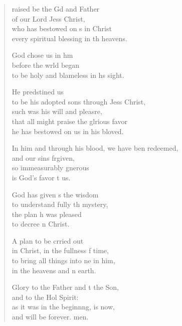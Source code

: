\settowidth{\versewidth}{In him and through his blood, we have been redeemed, *}
\begin{verse}%
  \begin{patverse}
raised be the Gd and Father\Med\\
of our Lord Jess Christ,\\
who has bestowed on s in Christ\Med\\
every spiritual blessing in th heavens.

God chose us in h\pointup{\i}m\Flex\\
before the wrld began\Med\\
to be holy and blameless in h\pointup{\i}s sight.

He predstined us\Med\\
to be his adopted sons through Jess Christ,\Med\\
such was his will and pleasre,\Flex\\
that all might praise the glrious favor\Med\\
he has bestowed on us in his bloved.

In him and through his blood, we have ben redeemed,\Med\\
and our sins frgiven,\\
so immeasurably gnerous\Med\\
is God’s favor t us.

God has given s the wisdom\Med\\
to understand fully th mystery,\\
the plan h was pleased\Med\\
to decree \pointup{\i}n Christ.

A plan to be crried out\Med\\
in Christ, in the fullness f time,\\
to bring all things into ne in him,\Med\\
in the heavens and n earth.

Glory to the Father and t the Son,\Med\\
and to the Hol Spirit:\\
as it was in the beginn\pointup{\i}ng, is now,\Med\\
and will be forever. men.
  \end{patverse}
\end{verse}

